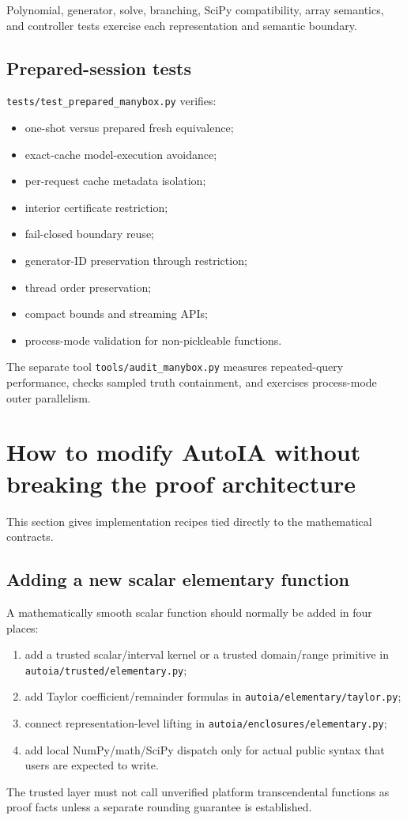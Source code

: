 \documentclass[11pt]{article}
\newcommand{\codepath}[1]{\nolinkurl{#1}}
\begin{document}
Polynomial, generator, solve, branching, SciPy compatibility, array semantics,
and controller tests exercise each representation and semantic boundary.

\subsection{Prepared-session tests}

\codepath{tests/test_prepared_manybox.py} verifies:
\begin{itemize}[leftmargin=*]
\item one-shot versus prepared fresh equivalence;
\item exact-cache model-execution avoidance;
\item per-request cache metadata isolation;
\item interior certificate restriction;
\item fail-closed boundary reuse;
\item generator-ID preservation through restriction;
\item thread order preservation;
\item compact bounds and streaming APIs;
\item process-mode validation for non-pickleable functions.
\end{itemize}
The separate tool \codepath{tools/audit_manybox.py} measures repeated-query
performance, checks sampled truth containment, and exercises process-mode outer
parallelism.

\section{How to modify AutoIA without breaking the proof architecture}

This section gives implementation recipes tied directly to the mathematical
contracts.

\subsection{Adding a new scalar elementary function}

A mathematically smooth scalar function should normally be added in four places:
\begin{enumerate}[leftmargin=*]
\item add a trusted scalar/interval kernel or a trusted domain/range primitive in
\codepath{autoia/trusted/elementary.py};
\item add Taylor coefficient/remainder formulas in
\codepath{autoia/elementary/taylor.py};
\item connect representation-level lifting in
\codepath{autoia/enclosures/elementary.py};
\item add local NumPy/math/SciPy dispatch only for actual public syntax that
users are expected to write.
\end{enumerate}
The trusted layer must not call unverified platform transcendental functions as
proof facts unless a separate rounding guarantee is established.
\end{document}

